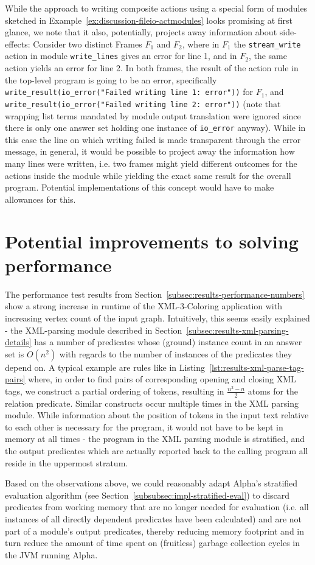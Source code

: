 While the approach to writing composite actions using a special form of modules sketched in Example~\ref{ex:discussion-fileio-actmodules} looks promising at first glance, we note that it also, potentially, projects away information about side-effects: Consider two distinct Frames $F_1$ and $F_2$, where in $F_1$ the \texttt{stream\_write} action in module \texttt{write\_lines} gives an error for line 1, and in $F_2$, the same action yields an error for line 2. In both frames, the result of the action rule in the top-level program is going to be an error, specifically \texttt{write\_result(io\_error("Failed writing line 1: error"))} for $F_1$, and \texttt{write\_result(io\_error("Failed writing line 2: error"))} (note that wrapping list terms mandated by module output translation were ignored since there is only one answer set holding one instance of \texttt{io\_error} anyway). While in this case the line on which writing failed is made transparent through the error message, in general, it would be possible to project away the information how many lines were written, i.e. two frames might yield different outcomes for the actions inside the module while yielding the exact same result for the overall program. Potential implementations of this concept would have to make allowances for this.


\section{Potential improvements to solving performance}

The performance test results from Section~\ref{subsec:results-performance-numbers} show a strong increase in runtime of the XML-3-Coloring application with increasing vertex count of the input graph. Intuitively, this seems easily explained - the XML-parsing module described in Section~\ref{subsec:results-xml-parsing-details} has a number of predicates whose (ground) instance count in an answer set is $O(n^2)$ with regards to the number of instances of the predicates they depend on. A typical example are rules like in Listing~\ref{lst:results-xml-parse-tag-pairs} where, in order to find pairs of corresponding opening and closing XML tags, we construct a partial ordering of tokens, resulting in $\frac{n^2 - n}{2}$ atoms for the relation predicate. Similar constructs occur multiple times in the XML parsing module. While information about the position of tokens in the input text relative to each other is necessary for the program, it would not have to be kept in memory at all times - the program in the XML parsing module is stratified, and the output predicates which are actually reported back to the calling program all reside in the uppermost stratum.

Based on the observations above, we could reasonably adapt Alpha's stratified evaluation algorithm (see Section~\ref{subsubsec:impl-stratified-eval}) to discard predicates from working memory that are no longer needed for evaluation (i.e. all instances of all directly dependent predicates have been calculated) and are not part of a module's output predicates, thereby reducing memory footprint and in turn reduce the amount of time spent on (fruitless) garbage collection cycles in the JVM running Alpha.